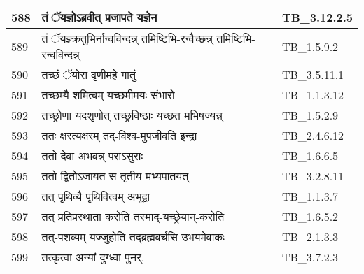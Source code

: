 \documentclass[17pt]{extarticle}
\begin{document}
\begin{longtable}{||p{0.4in}||p{4.9in}||p{0.9in}||}
    \hline
        
    588 & तं ॅयज्ञोऽब्रवीत् प्रजापते यज्ञेन & TB\_3.12.2.5       \\
    
    \hline
        
    589 & तं ॅयज्ञ्क्रतुभिर्नान्वविन्दन्न् तमिष्टिभि{-}रन्वैच्छन्न् तमिष्टिभि{-}रन्वविन्दन्न् & TB\_1.5.9.2       \\
    
    \hline
        
    590 & तच्छं ॅयोरा वृणीमहे गातुं & TB\_3.5.11.1       \\
    
    \hline
        
    591 & तच्छम्यै शमित्वम् यच्छमीमयः संभारो & TB\_1.1.3.12       \\
    
    \hline
        
    592 & तच्छ्रोणा यदशृणोत् तच्छ्रविष्ठाः यच्छत{-}मभिषज्यन्न् & TB\_1.5.2.9       \\
    
    \hline
        
    593 & ततः क्षरत्यक्षरम् तद्{-}विश्व{-}मुपजीवति इन्द्रा & TB\_2.4.6.12       \\
    
    \hline
        
    594 & ततो देवा अभवन्न् पराऽसुराः & TB\_1.6.6.5       \\
    
    \hline
        
    595 & ततो द्वितोऽजायत स तृतीय{-}मभ्यपातयत् & TB\_3.2.8.11       \\
    
    \hline
        
    596 & तत् पृथिव्यै पृथिवित्वम् अभूद्वा & TB\_1.1.3.7       \\
    
    \hline
        
    597 & तत् प्रतिप्रस्थाता करोति तस्माद्{-}यच्छ्रेयान्{-}करोति & TB\_1.6.5.2       \\
    
    \hline
        
    598 & तत्{-}पशव्यम् यज्जुहोति तद्ब्रह्मवर्चसि उभयमेवाकः & TB\_2.1.3.3       \\
    
    \hline
        
    599 & तत्कृत्वा अन्यां दुग्ध्वा पुनर्. & TB\_3.7.2.3       \\
    

\end{longtable}
\end{document}

